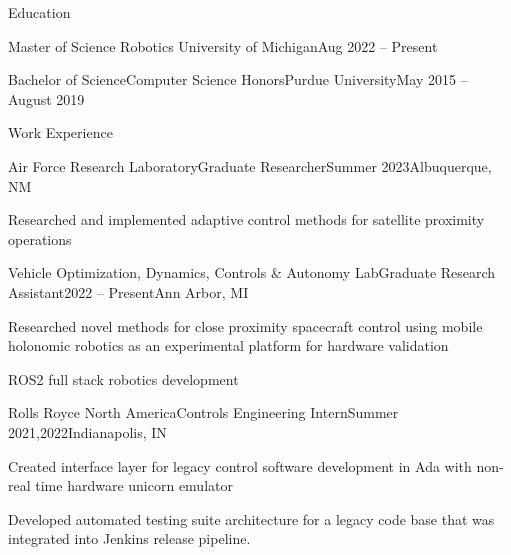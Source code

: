 \documentclass[]{jheidegger-resume}
\begin{document}
\resumeheader
{}
{}
{}
{}
{}

\begin{section}{Education}
    \begin{subsectionnobullet}{Master of Science}
    {Robotics}
    {University of Michigan}{Aug 2022 -- Present}
    \end{subsectionnobullet}
    
    \begin{subsectionnobullet}{Bachelor of Science}{Computer Science Honors}{Purdue University}{May 2015 -- August 2019}
    \end{subsectionnobullet}
\end{section}

\begin{section}{Work Experience}
    \begin{subsection}{Air Force Research Laboratory}{Graduate Researcher}{Summer 2023}{Albuquerque, NM}
        \item Researched and implemented adaptive control methods for satellite proximity operations
    \end{subsection}
    \begin{subsection}{Vehicle Optimization, Dynamics, Controls \& Autonomy Lab}{Graduate Research Assistant}{2022 -- Present}{Ann Arbor, MI}
        \item Researched novel methods for close proximity spacecraft control using mobile holonomic robotics as an experimental platform for hardware validation
        \item ROS2 full stack robotics development
    \end{subsection}
    
    \begin{subsection}{Rolls Royce North America}{Controls Engineering Intern}{Summer 2021,2022}{Indianapolis, IN}
        \item Created interface layer for legacy control software development in Ada with non-real time hardware unicorn emulator
        \item Developed automated testing suite architecture for a legacy code base that was integrated into Jenkins release pipeline.
    \end{subsection}
    
\end{section}
\end{document}
